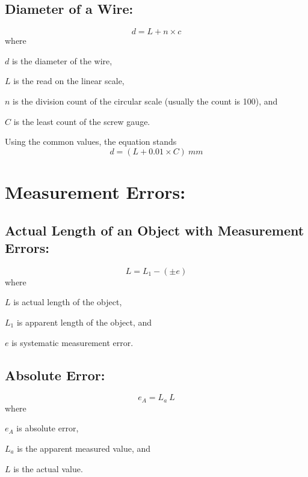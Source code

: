 \documentclass[a4paper]{report}
\begin{document}
        \subsection{Diameter of a Wire: }
            \begin{equation}
                d = L + n \times c
            \end{equation}
            where
            \begin{description}
                \item $d$ is the diameter of the wire,
                \item $L$ is the read on the linear scale,
                \item $n$ is the division count of the circular scale (usually the count is 100), and
                \item $C$ is the least count of the screw gauge.
            \end{description}
            Using the common values, the equation stands
            \begin{equation}
                d = ( L + 0.01 \times C ) \: mm
            \end{equation}
            
    \section{Measurement Errors: }    
        \subsection{Actual Length of an Object with Measurement Errors: }
            \begin{equation}
                L = L_1 - (\pm e)
            \end{equation}
            where
            \begin{description}
                \item $L$ is actual length of the object,
                \item $L_1$ is apparent length of the object, and
                \item $e$ is systematic measurement error.
            \end{description}
        \subsection{Absolute Error: }
            \begin{equation}
                e_A = L_a ~ L
            \end{equation}
            where
            \begin{description}
                \item $e_A$ is absolute error,
                \item $L_a$ is the apparent measured value, and
                \item $L$ is the actual value.
            \end{description}
\end{document}
